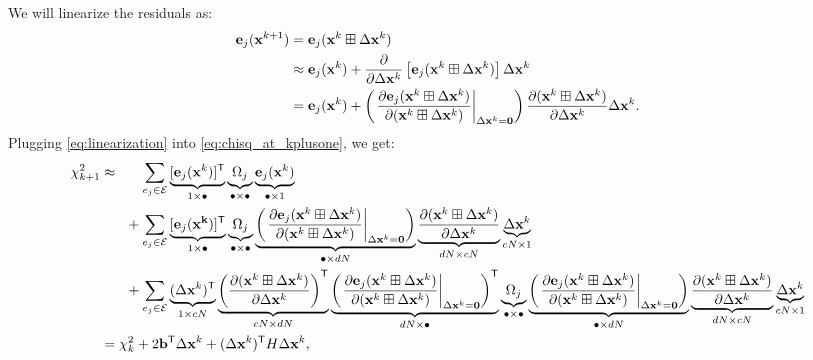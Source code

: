 \documentclass{article}
\newcommand{\transp}{{\scriptstyle{\mathsf{T}}}}
\begin{document}
%
We will linearize the residuals as:
%
\begin{align}
    \mathbf{e}_j(\mathbf{x}^{k+1}) &= \mathbf{e}_j(\mathbf{x}^k \boxplus \Delta \mathbf{x}^k) \notag \\
    &\approx \mathbf{e}_j(\mathbf{x}^{k}) + \frac{\partial}{\partial \Delta \mathbf{x}^k} \left[ \mathbf{e}_j(\mathbf{x}^k \boxplus \Delta \mathbf{x}^k) \right] \Delta \mathbf{x}^k \notag \\
    &= \mathbf{e}_j(\mathbf{x}^{k}) + \left( \left. \frac{\partial \mathbf{e}_j(\mathbf{x}^k \boxplus \Delta \mathbf{x}^k)}{\partial (\mathbf{x}^k \boxplus \Delta \mathbf{x}^k)} \right|_{\Delta \mathbf{x}^k = \mathbf{0}} \right) \frac{\partial (\mathbf{x}^k \boxplus \Delta \mathbf{x}^k)}{\partial \Delta \mathbf{x}^k} \Delta \mathbf{x}^k.  \label{eq:linearization}
\end{align}
%
Plugging \eqref{eq:linearization} into \eqref{eq:chisq_at_kplusone}, we get:
%
\small
\begin{align}
    \chi_{k+1}^2 &\approx \ \ \ \ \ \sum_{e_j \in \mathcal{E}} \underbrace{[ \mathbf{e}_j(\mathbf{x}^k)]^\transp}_{1 \times \bullet} \underbrace{\Omega_j}_{\bullet \times \bullet} \underbrace{\mathbf{e}_j(\mathbf{x}^k)}_{\bullet \times 1} \notag \\
    &\hphantom{\approx} \ \ \ + \sum_{e_j \in \mathcal{E}} \underbrace{[ \mathbf{e}_j(\mathbf{x^k}) ]^\transp }_{1 \times \bullet} \underbrace{\Omega_j}_{\bullet \times \bullet} \underbrace{\left( \left. \frac{\partial \mathbf{e}_j(\mathbf{x}^k \boxplus \Delta \mathbf{x}^k)}{\partial (\mathbf{x}^k \boxplus \Delta \mathbf{x}^k)} \right|_{\Delta \mathbf{x}^k = \mathbf{0}} \right)}_{\bullet \times dN} \underbrace{\frac{\partial (\mathbf{x}^k \boxplus \Delta \mathbf{x}^k)}{\partial \Delta \mathbf{x}^k}}_{dN \times cN} \underbrace{\Delta \mathbf{x}^k}_{cN \times 1} \notag \\
    &\hphantom{\approx} \ \ \ + \sum_{e_j \in \mathcal{E}} \underbrace{(\Delta \mathbf{x}^k)^\transp}_{1 \times cN} \underbrace{ \left( \frac{\partial (\mathbf{x}^k \boxplus \Delta \mathbf{x}^k)}{\partial \Delta \mathbf{x}^k} \right)^\transp}_{cN \times dN} \underbrace{\left( \left. \frac{\partial \mathbf{e}_j(\mathbf{x}^k \boxplus \Delta \mathbf{x}^k)}{\partial (\mathbf{x}^k \boxplus \Delta \mathbf{x}^k)} \right|_{\Delta \mathbf{x}^k = \mathbf{0}} \right)^\transp}_{dN \times \bullet} \underbrace{\Omega_j}_{\bullet \times \bullet} \underbrace{\left( \left. \frac{\partial \mathbf{e}_j(\mathbf{x}^k \boxplus \Delta \mathbf{x}^k)}{\partial (\mathbf{x}^k \boxplus \Delta \mathbf{x}^k)} \right|_{\Delta \mathbf{x}^k = \mathbf{0}} \right)}_{\bullet \times dN} \underbrace{\frac{\partial (\mathbf{x}^k \boxplus \Delta \mathbf{x}^k)}{\partial \Delta \mathbf{x}^k}}_{dN \times cN} \underbrace{\Delta \mathbf{x}^k}_{cN \times 1} \notag \\
    &= \chi_k^2 + 2 \mathbf{b}^\transp \Delta \mathbf{x}^k + (\Delta \mathbf{x}^k)^\transp H \Delta \mathbf{x}^k,  \notag
\end{align}
\end{document}
